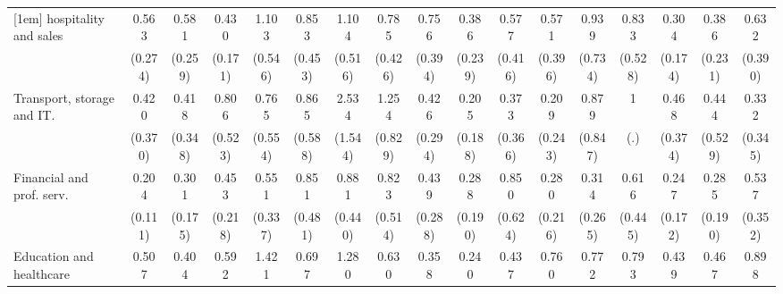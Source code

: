 {\begin{tabular}{l*{16}{c}}
[1em]
hospitality and sales&       0.563         &       0.581         &       0.430\sym{*}  &       1.103         &       0.853         &       1.104         &       0.785         &       0.756         &       0.386         &       0.577         &       0.571         &       0.939         &       0.833         &       0.304\sym{*}  &       0.386         &       0.632         \\
                    &     (0.274)         &     (0.259)         &     (0.171)         &     (0.546)         &     (0.453)         &     (0.516)         &     (0.426)         &     (0.394)         &     (0.239)         &     (0.416)         &     (0.396)         &     (0.734)         &     (0.528)         &     (0.174)         &     (0.231)         &     (0.390)         \\
[1em]
Transport, storage and IT.&       0.420         &       0.418         &       0.806         &       0.765         &       0.865         &       2.534         &       1.254         &       0.426         &       0.205         &       0.373         &       0.209         &       0.879         &           1         &       0.468         &       0.444         &       0.332         \\
                    &     (0.370)         &     (0.348)         &     (0.523)         &     (0.554)         &     (0.588)         &     (1.544)         &     (0.829)         &     (0.294)         &     (0.188)         &     (0.366)         &     (0.243)         &     (0.847)         &         (.)         &     (0.374)         &     (0.529)         &     (0.345)         \\
[1em]
Financial and prof. serv.&       0.204\sym{**} &       0.301\sym{*}  &       0.453         &       0.551         &       0.851         &       0.881         &       0.823         &       0.439         &       0.288         &       0.850         &       0.280         &       0.314         &       0.616         &       0.247\sym{*}  &       0.285         &       0.537         \\
                    &     (0.111)         &     (0.175)         &     (0.218)         &     (0.337)         &     (0.481)         &     (0.440)         &     (0.514)         &     (0.288)         &     (0.190)         &     (0.624)         &     (0.216)         &     (0.265)         &     (0.445)         &     (0.172)         &     (0.190)         &     (0.352)         \\
[1em]
Education and healthcare&       0.507         &       0.404         &       0.592         &       1.421         &       0.697         &       1.280         &       0.630         &       0.358         &       0.240\sym{*}  &       0.437         &       0.760         &       0.772         &       0.793         &       0.439         &       0.467         &       0.898         \\

\end{tabular}}

